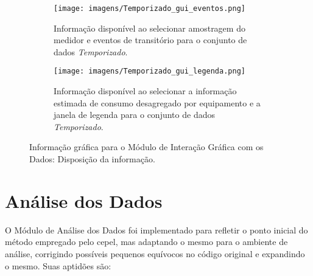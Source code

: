\begin{figure*}[p!]
  \begin{center}
    \begin{subfigure}[c]{\textwidth}
      \texttt{[image: imagens/Temporizado\_gui\_eventos.png]}
      \caption{Informação disponível ao selecionar amostragem do
medidor e eventos de transitório para o conjunto de dados \emph{Temporizado}.}
      \label{fig:temporizado_gui_eventos}
    \end{subfigure}
    \hfill
    \begin{subfigure}[c]{\textwidth}
      \texttt{[image: imagens/Temporizado\_gui\_legenda.png]}
      \caption{Informação disponível ao selecionar a informação
estimada de consumo desagregado por equipamento e a janela de legenda
para o conjunto de dados \emph{Temporizado}.}
      \label{fig:temporizado_gui_legenda}
    \end{subfigure}
  \end{center}
\caption{Informação gráfica para o Módulo de Interação Gráfica com os
Dados: Disposição da informação.}
\label{fig:gui_informacao} \end{figure*}



\section{Análise dos Dados}
\label{sec:analise}

O Módulo de Análise dos Dados foi implementado para refletir o ponto
inicial do método empregado pelo \acs{cepel}, mas adaptando o
mesmo para o ambiente de análise, corrigindo possíveis pequenos
equívocos no código original e expandindo o mesmo. Suas aptidões
são:

